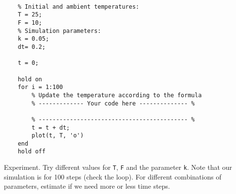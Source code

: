 \documentclass{article}
\begin{document}
\begin{verbatim}

    % Initial and ambient temperatures:
    T = 25;
    F = 10;
    % Simulation parameters:
    k = 0.05;
    dt= 0.2;

    t = 0;

    hold on
    for i = 1:100
        % Update the temperature according to the formula
        % ------------- Your code here -------------- %
        
        % ------------------------------------------- %
        t = t + dt; 
        plot(t, T, 'o')
    end
    hold off

\end{verbatim}

Experiment. Try different values for \texttt{T}, \texttt{F}
and the parameter \texttt{k}. Note that our simulation is
for 100 steps (check the loop). For different combinations
of parameters, estimate if we need more or less time steps.
\end{document}
